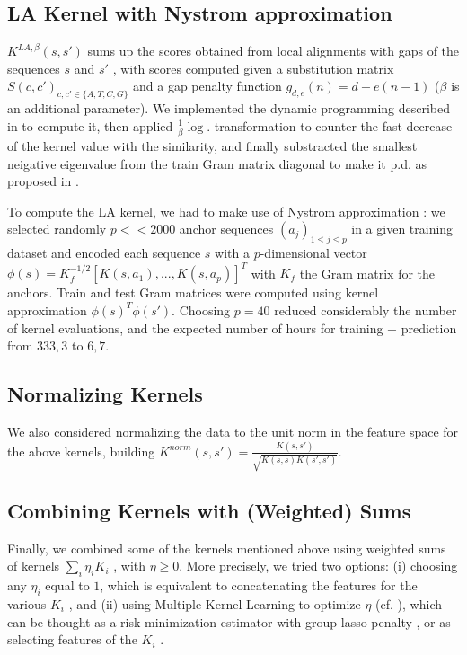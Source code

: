 \documentclass[11pt,twocolumn,letterpaper]{article}
\begin{document}
\subsection{LA Kernel with Nystrom approximation}

$K^{LA, \beta}(s,s')$ sums up the scores obtained from local alignments with gaps of the sequences $s$ and $s'$  \cite{article}, with scores computed given a substitution matrix $S(c,c')_{c,c' \in \{A,T,C,G\}}$ and a gap penalty function $g_{d,e}(n) = d+e(n-1)$ ($\beta$ is an additional parameter).  We implemented the dynamic programming described in \cite{article} to compute it, then applied $\frac{1}{\beta} \log .$ transformation to counter the fast decrease of the kernel value with the similarity, and finally substracted the smallest neigative eigenvalue from the train Gram matrix diagonal to make it p.d. as proposed in \cite{article}. 

To compute the LA kernel, we had to make use of Nystrom approximation \cite{MVAKernels}: we selected randomly $p<<2000$ anchor sequences $(a_j)_{1 \leq j \leq p}$ in a given training dataset and encoded each sequence $s$ with a $p$-dimensional vector $\phi(s) = K_f^{-1/2} [K(s,a_1),...,K(s,a_p)]^T$ with $K_f$ the Gram matrix for the anchors. Train and test Gram matrices were computed using kernel approximation $\phi(s)^T\phi(s')$. Choosing $p=40$ reduced considerably the number of kernel evaluations, and the expected number of hours for training + prediction from $333,3$ to $6,7$.  

\subsection{Normalizing Kernels}

We also considered normalizing the data to the unit norm in the feature space for the above kernels, building $K^{norm}(s,s') = \frac{K(s,s')}{\sqrt{K(s,s)K(s',s')}}$. 

\subsection{Combining Kernels with (Weighted) Sums}

Finally, we combined some of the kernels mentioned above using weighted sums of kernels $\sum_{i} \eta_i K_i$ , with $\eta \geq 0$. More precisely, we tried two options: (i) choosing any $\eta_i$ equal to $1$, which is equivalent to concatenating the features for the various $K_i$ \cite{MVAKernels}, and (ii) using Multiple Kernel Learning to optimize $\eta$ (cf. ), which can be thought as a risk minimization estimator with group lasso penalty \cite{MVAKernels}, or as selecting features of the $K_i$ .
\end{document}
